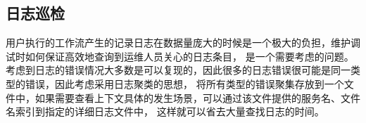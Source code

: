 %
%
%

\subsection{日志巡检}

用户执行的工作流产生的记录日志在数据量庞大的时候是一个极大的负担，维护调试时如何保证高效地查询到运维人员关心的日志条目，
是一个需要考虑的问题。考虑到日志的错误情况大多数是可以复现的，因此很多的日志错误很可能是同一类型的错误，因此考虑采用日志聚类的思想，
将所有类型的错误聚集存放到一个文件中，如果需要查看上下文具体的发生场景，可以通过该文件提供的服务名、文件名索引到指定的详细日志文件中，
这样就可以省去大量查找日志的时间。

%
